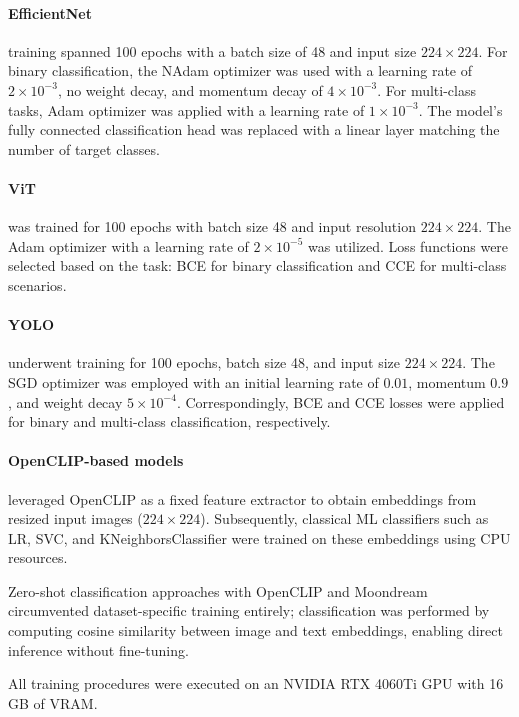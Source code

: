 \paragraph{EfficientNet} training spanned 100 epochs with a batch size of 48 and input size $224 \times 224$. For
binary classification, the \ac{NAdam} optimizer was used with a learning rate of $2 \times 10^{-3}$, no weight
decay, and momentum decay of $4 \times 10^{-3}$. For multi-class tasks, Adam optimizer was applied with a learning rate of
$1 \times 10^{-3}$. The model’s fully connected classification head was replaced with a linear layer matching the
number of target classes.

\paragraph{\ac{ViT}} was trained for 100 epochs with batch size 48 and input resolution $224 \times 224$. The Adam
optimizer with a learning rate of $2 \times 10^{-5}$ was utilized. Loss functions were selected based on the task:
\ac{BCE} for binary classification and \ac{CCE} for multi-class scenarios.

\paragraph{\ac{YOLO}} underwent training for 100 epochs, batch size 48, and input size $224 \times 224$. The
\ac{SGD} optimizer was employed with an initial learning rate of $0.01$, momentum $0.9$, and weight decay
$5 \times 10^{-4}$. Correspondingly, \ac{BCE} and \ac{CCE} losses were applied for binary and multi-class
classification, respectively.

\paragraph{OpenCLIP-based models} leveraged OpenCLIP as a fixed feature extractor to obtain embeddings from resized
input images ($224 \times 224$). Subsequently, classical \ac{ML} classifiers such as \ac{LR}, \ac{SVC},
and KNeighborsClassifier were trained on these embeddings using CPU resources.

Zero-shot classification approaches
with OpenCLIP and Moondream circumvented dataset-specific training entirely; classification was performed by
computing cosine similarity between image and text embeddings, enabling direct inference without fine-tuning.

All training procedures were executed on an NVIDIA RTX 4060Ti GPU with 16 GB of VRAM.

